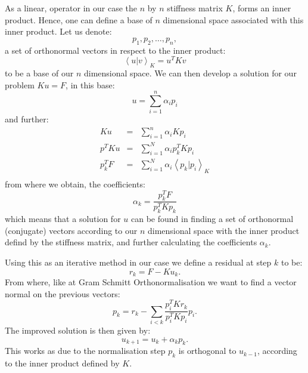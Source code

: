 As a linear, operator in our case the $n$ by $n$ stiffness matrix $K$, forms an
inner product. Hence, one can define a base of $n$ dimensional space
associated with this inner product. Let us denote:
\begin{equation}
  {p_1,p_2,\ldots,p_n},
\end{equation}
a set of orthonormal vectors in respect to the inner product:
\begin{equation}
  \left<u|v\right>_K = u^{T}Kv
\end{equation}
to be a base of our $n$ dimensional space. We can then develop a
solution for our problem $Ku=F$, in this base:
\begin{equation}
u = \sum_{i=1}^n\alpha_ip_i
\end{equation}
and further:
\begin{eqnarray}
  Ku&=&\sum_{i=1}^n\alpha_i Kp_i \\
  p^{T}Ku&=&\sum_{i=1}^N\alpha_ip_k^{T}Kp_i \\
  p_k^{T}F&=&\sum_{i=1}^N\alpha_i\left<p_k|p_i\right>_K \\
\end{eqnarray}
from where we obtain, the coefficients:
\begin{equation}
  \alpha_k=\frac{p_k^{T}F}{p_k^{T}Kp_k}
\end{equation}
which means that a solution for $u$ can be found in finding a set of
orthonormal (conjugate) vectors according to our $n$ dimensional space
with the inner product defind by the stiffness matrix, and further
calculating the coefficients $\alpha_k$.

Using this as an iterative method in our case we define a residual at
step $k$ to be:
\begin{equation}
  r_k = F - Ku_k.
\end{equation}
From where, like at Gram Schmitt Orthonormalisation we want to find a
vector normal on the previous vectors:
\begin{equation}
p_k = r_k - \sum_{i<k}\frac{p_i^TKr_k}{p_i^TKp_i}p_i.
\end{equation}
The improved solution is then given by:
\begin{equation}
  u_{k+1} = u_{k}+\alpha_kp_k.
\end{equation}
This works as due to the normalisation step $p_k$ is orthogonal to
$u_{k-1}$, according to the inner product defined by $K$.

